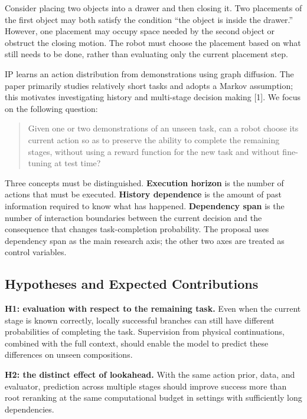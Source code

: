 \documentclass[
  10pt,
]{article}
\begin{document}
Consider placing two objects into a drawer and then closing it. Two placements of the first object may both satisfy the condition ``the object is inside the drawer.'' However, one placement may occupy space needed by the second object or obstruct the closing motion. The robot must choose the placement based on what still needs to be done, rather than evaluating only the current placement step.

IP learns an action distribution from demonstrations using graph diffusion. The paper primarily studies relatively short tasks and adopts a Markov assumption; this motivates investigating history and multi-stage decision making {[}1{]}. We focus on the following question:

\begin{quote}
Given one or two demonstrations of an unseen task, can a robot choose its current action so as to preserve the ability to complete the remaining stages, without using a reward function for the new task and without fine-tuning at test time?
\end{quote}

Three concepts must be distinguished. \textbf{Execution horizon} is the number of actions that must be executed. \textbf{History dependence} is the amount of past information required to know what has happened. \textbf{Dependency span} is the number of interaction boundaries between the current decision and the consequence that changes task-completion probability. The proposal uses dependency span as the main research axis; the other two axes are treated as control variables.

\hypertarget{giux1ea3-thuyux1ebft-vuxe0-ux111uxf3ng-guxf3p-dux1ef1-kiux1ebfn}{%
\subsection{Hypotheses and Expected Contributions}\label{giux1ea3-thuyux1ebft-vuxe0-ux111uxf3ng-guxf3p-dux1ef1-kiux1ebfn}}

\textbf{H1: evaluation with respect to the remaining task.} Even when the current stage is known correctly, locally successful branches can still have different probabilities of completing the task. Supervision from physical continuations, combined with the full context, should enable the model to predict these differences on unseen compositions.

\textbf{H2: the distinct effect of lookahead.} With the same action prior, data, and evaluator, prediction across multiple stages should improve success more than root reranking at the same computational budget in settings with sufficiently long dependencies.
\end{document}
